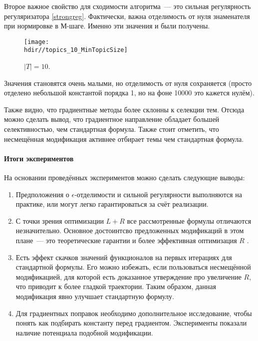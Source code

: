 \documentclass[12pt, twoside]{article}
\newcommand{\hdir}{.}
\begin{document}
Второе важное свойство для сходимости алгоритма~--- это сильная регулярность регуляризатора \ref{strongreg}. Фактически, важна отделимость от нуля знаменателя при нормировке в М-шаге. Именно эти значения  и были получены.

\begin{figure}[!ht]
	\centering
	\caption{$|T| = 10$.}    
	\texttt{[image: \\hdir//topics\_10\_MinTopicSize]}
\end{figure}

Значения становятся очень малыми, но отделимость от нуля сохраняется (просто отделено небольшой константой порядка 1, но на фоне 10000 это кажется нулём). 

Также видно, что градиентные методы более склонны к селекции тем. Отсюда можно сделать вывод, что градиентное направление обладает большей селективностью, чем стандартная формула. Также стоит отметить, что несмещённая модификация активнее отбирает темы чем стандартная формула.
\paragraph{Итоги экспериментов}
На основании проведённых экспериментов можно сделать следующие выводы:
\begin{enumerate}
\item Предположения о $\epsilon$-отделимости и сильной регулярности выполняются на практике, или могут легко гарантироваться за счёт реализации.
\item С точки зрения оптимизации $L + R$ все рассмотренные формулы отличаются незначительно. Основное достоинтсво предложенных модификаций в этом плане~--- это теоретические гарантии и более эффективная оптимизация $R$ .
\item Есть эффект скачков значений функционалов на первых итерациях для стандартной формулы. Его можно избежать, если пользоваться несмещённой модификацией, для которой есть доказанное утверждение про увеличение $R$, что приводит к более гладкой траектории. Таким образом, данная модификация явно улучшает стандартную формулу.
\item Для градиентных поправок необходимо дополнительное исследование, чтобы понять как подбирать константу перед градиентом. Эксперименты показали наличие потенциала подобной модификации.
\end{enumerate}
\end{document}
